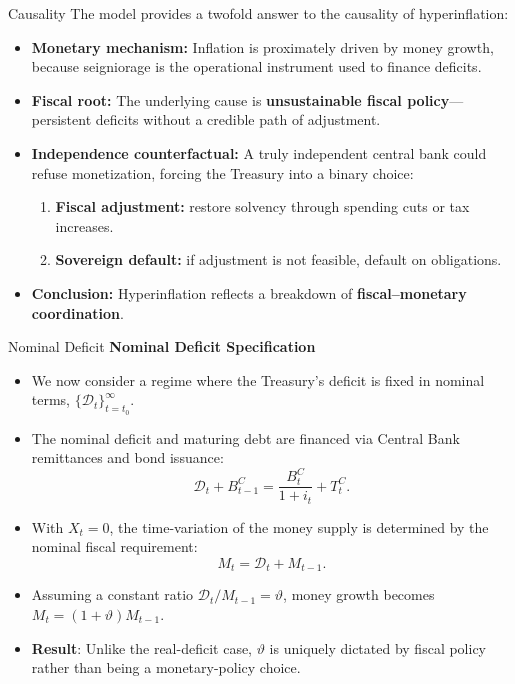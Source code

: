 \documentclass[11pt,aspectratio=169]{beamer}
\begin{document}
\begin{frame}{Causality}
\small
The model provides a twofold answer to the causality of hyperinflation:
\vspace{0.2cm}
\begin{itemize}
    \item \textbf{Monetary mechanism:} Inflation is proximately driven by money growth, because seigniorage is the operational instrument used to finance deficits.
    \item \textbf{Fiscal root:} The underlying cause is \textbf{unsustainable fiscal policy}—persistent deficits without a credible path of adjustment.
    \item \textbf{Independence counterfactual:} A truly independent central bank could refuse monetization, forcing the Treasury into a binary choice:
    \begin{enumerate}
        \item \textbf{Fiscal adjustment:} restore solvency through spending cuts or tax increases.
        \item \textbf{Sovereign default:} if adjustment is not feasible, default on obligations.
    \end{enumerate}
    \item \textbf{Conclusion:} Hyperinflation reflects a breakdown of \textbf{fiscal–monetary coordination}.
\end{itemize}
\end{frame}


\begin{frame}{Nominal Deficit}
\small
\textbf{Nominal Deficit Specification}
\begin{itemize}
    \item We now consider a regime where the Treasury's deficit is fixed in nominal terms, $\{\mathcal{D}_t\}_{t=t_0}^{\infty}$.
    \item The nominal deficit and maturing debt are financed via Central Bank remittances and bond issuance:
    \begin{equation*}
    \mathcal{D}_{t}+B_{t-1}^{C}=\frac{B_{t}^{C}}{1+i_{t}}+T_{t}^{C}.
    \end{equation*}
    \item  With $X_t = 0$, the time-variation of the money supply is determined by the nominal fiscal requirement:
    \begin{equation*}
    M_{t}=\mathcal{D}_{t}+M_{t-1}.
    \end{equation*}
    \item  Assuming a constant ratio $\mathcal{D}_t/M_{t-1} = \vartheta$, money growth becomes $M_t = (1+\vartheta)M_{t-1}$.
    \item \textbf{Result}: Unlike the real-deficit case, $\vartheta$ is uniquely dictated by fiscal policy rather than being a monetary-policy choice.
\end{itemize}
\end{frame}
\end{document}
